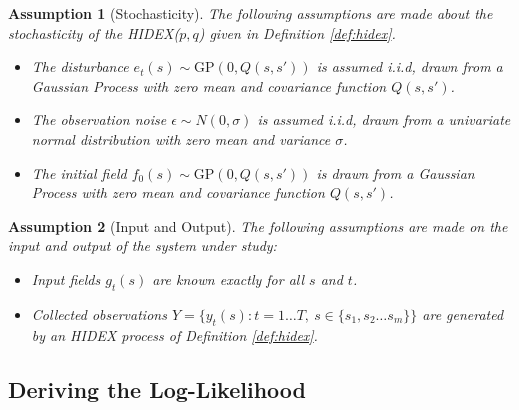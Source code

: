 \documentclass{IEEEtran}
\newtheorem{assumption}{Assumption}
\begin{document}
\begin{assumption}[Stochasticity]
	\label{ass:noise}
	The following assumptions are made about the stochasticity of the HIDEX($p,q$) given in Definition \ref{def:hidex}.
	\begin{itemize}
		\item The disturbance $e_t(s) \sim \mathrm{GP}(0,Q(s,s'))$ is assumed i.i.d, drawn from a Gaussian Process with zero mean and covariance function $Q(s,s')$.
		\item The observation noise $\epsilon \sim N(0,\sigma)$ is assumed i.i.d, drawn from a univariate normal distribution with zero mean and variance $\sigma$.
		\item The initial field $f_0(s) \sim \mathrm{GP}(0,Q(s,s'))$ is drawn from a Gaussian Process with zero mean and covariance function $Q(s,s')$.
	\end{itemize}
\end{assumption}

\begin{assumption}[Input and Output]
	\label{ass:inout}
The following assumptions are made on the input and output of the system under study:
	\begin{itemize}
		\item Input fields $g_t(s)$ are known exactly for all $s$ and $t$.
		\item Collected observations $Y = \{ y_t(s) : t = 1 \ldots T, ~ s \in \{s_1, s_2 \ldots s_m\} \}$ are generated by an HIDEX process of Definition \ref{def:hidex}.
	\end{itemize}
\end{assumption}

\subsection{Deriving the Log-Likelihood}
\end{document}
